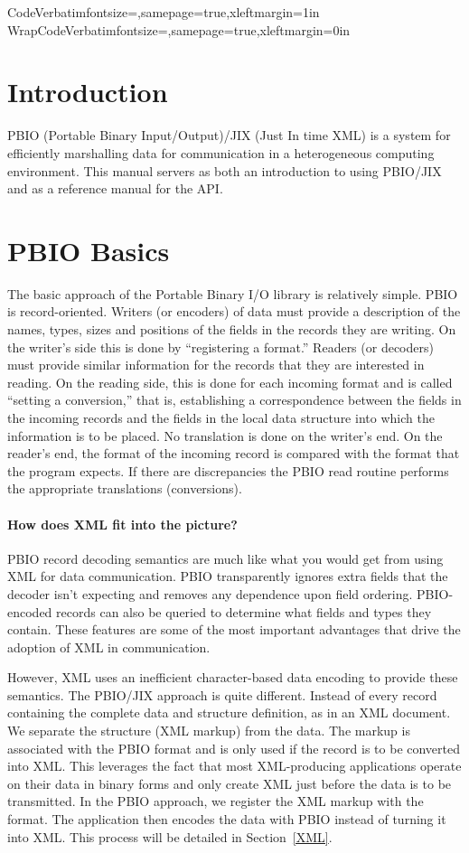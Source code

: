 \DefineVerbatimEnvironment%
{Code}{Verbatim}{fontsize=\small,samepage=true,xleftmargin=1in}
\DefineVerbatimEnvironment%
{WrapCode}{Verbatim}{fontsize=\small,samepage=true,xleftmargin=0in}
\section{Introduction}

PBIO (Portable Binary Input/Output)/JIX (Just In time XML) is a system for
efficiently marshalling data for communication in a heterogeneous computing
environment.  This manual servers as both an introduction to using PBIO/JIX
and as a reference manual for the API.

\section{PBIO Basics}

The basic approach of the Portable Binary I/O library is relatively simple.
PBIO is record-oriented.  Writers (or encoders) of data must provide a
description of the names, types, sizes and positions of the fields in the
records they are writing.  On the writer's side this is done by ``registering
a format.''  Readers (or decoders) must provide similar information for the
records that they are interested in reading.  On the reading side, this is
done for each incoming format and is called ``setting a conversion,'' that
is, establishing a correspondence between the fields in the incoming records
and the fields in the local data structure into which the information is to
be placed.  No translation is done on the writer's end.  On the reader's
end, the format of the incoming record is compared with the format that the
program expects.  If there are discrepancies the PBIO read routine performs
the appropriate translations (conversions).
\paragraph{How does XML fit into the picture?}  PBIO record decoding semantics
are much like what you would get from using XML for data communication.  PBIO
transparently ignores extra fields that the decoder isn't expecting and
removes any dependence upon field ordering.  PBIO-encoded records can also be
queried to determine what fields and types they contain.  These features are
some of the most important advantages that drive the adoption of XML in
communication.  

However, XML uses an inefficient character-based data encoding to provide
these semantics.   The PBIO/JIX approach is quite different.  Instead of every
record containing the complete data and structure definition, as in an XML
document.  We separate the structure (XML markup) from the data.   The markup
is associated with the PBIO format and is only used if the record is to be
converted into XML.  This leverages the fact that most XML-producing
applications operate on their data in binary forms and only create XML just
before the data is to be transmitted.  In the PBIO approach, we register the
XML markup with the format.  The application then encodes the data with PBIO
instead of turning it into XML.  This process will be detailed in
Section~\ref{XML}. 

